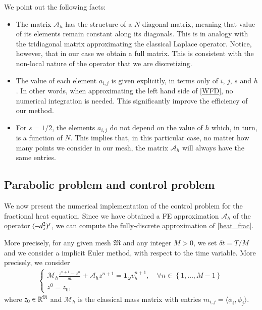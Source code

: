 \begin{remark}
We point out the following facts:
\begin{itemize}
	\item The matrix $\mathcal A_h$ has the structure of a $N$-diagonal matrix, meaning that value of its elements remain constant along its diagonals. This is in analogy with the tridiagonal matrix approximating the classical Laplace operator. Notice, however, that in our case we obtain a full matrix. This is consistent with the non-local nature of the operator that we are discretizing.
	
	\item The value of each element $a_{i,j}$ is given explicitly, in terms only of $i$, $j$, $s$ and $h$. In other words, when approximating the left hand side of \eqref{WFD}, no numerical integration is needed. This significantly improve the efficiency of our method.
	
	\item For $s=1/2$, the elements $a_{i,j}$ do not depend on the value of $h$ which, in turn, is a function of $N$. This implies that, in this particular case, no matter how many points we consider in our mesh, the matrix $\mathcal A_h$ will always have the same entries. 
\end{itemize}
\end{remark}

\subsection{Parabolic problem and control problem}\label{fe_parabolic}

We now present the numerical implementation of the control problem for the fractional heat equation. Since we have obtained a FE approximation $\mathcal A_h$ of the operator $(-d_x^2)^{s}$, we can compute the fully-discrete approximation of \eqref{heat_frac}. 

More precisely, for any given mesh $\mathfrak M$ and any integer $M>0$, we set $\delta t=T/M$ and we consider a implicit Euler method, with respect to the time variable. More precisely, we consider
%
\begin{align}\label{frac_heat_num}
	\begin{cases}
		\displaystyle\mathcal M_h \frac{z^{n+1}-z^n}{\delta t}+\mathcal A_h z^{n+1}=\mathbf{1}_\omega v_h^{n+1}, \quad \forall n\in \left\{1,\ldots,M-1\right\}
		\\
		z^0=z_0, 
	\end{cases}
\end{align}
%
where $z_0\in \mathbb R^{\mathfrak{M}}$ and $\mathcal M_h$ is the classical mass matrix with entries $m_{i,j}=\langle \phi_i,\phi_j\rangle$.

